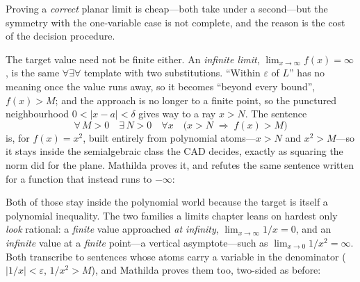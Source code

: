 Proving a \emph{correct} planar limit is cheap---both take under a second---but the
symmetry with the one-variable case is not complete, and the reason is the cost of
the decision procedure.

The target value need not be finite either. An \emph{infinite
limit}, \(\lim_{x\to\infty} f(x) = \infty\), is the same
\(\forall\exists\forall\) template with two substitutions. ``Within
\(\varepsilon\) of \(L\)'' has no meaning once the value runs away, so it becomes
``beyond every bound'', \(f(x) > M\); and the approach is no longer to a finite
point, so the punctured neighbourhood \(0<\lvert x-a\rvert<\delta\) gives way to a
ray \(x > N\). The sentence
\[
  \forall\,M>0 \quad \exists\,N>0 \quad \forall x \quad
  \bigl(x>N \;\Rightarrow\; f(x)>M\bigr)
\]
is, for \(f(x)=x^2\), built entirely from polynomial atoms---\(x>N\) and
\(x^2>M\)---so it stays inside the semialgebraic class the CAD decides, exactly as
squaring the norm did for the plane. Mathilda proves it, and refutes the same
sentence written for a function that instead runs to \(-\infty\):

\begin{codepairs}
\end{codepairs}

Both of those stay inside the polynomial world because the target is itself a
polynomial inequality. The two families a limits chapter leans on hardest only
\emph{look} rational: a \emph{finite} value approached \emph{at
infinity}, \(\lim_{x\to\infty}1/x=0\), and an
\emph{infinite} value at a \emph{finite} point---a vertical
asymptote---such
as \(\lim_{x\to0}1/x^2=\infty\). Both transcribe to sentences whose atoms carry a
variable in the denominator (\(\lvert 1/x\rvert<\varepsilon\), \(1/x^2>M\)), and
Mathilda proves them too, two-sided as before:

